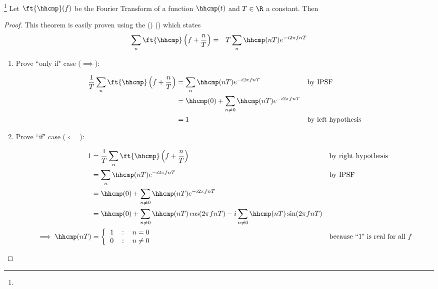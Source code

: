 \begin{theorem}
\footnote{
  }
\label{thm:unity}
Let $\ft{\hhcmp}(f)$ be the Fourier Transform of a function
$\hhcmp(t)$ and $T\in\R$ a constant.
Then
\thmbox{
  \left[
  \hhcmp(nT) =
  \left\{
     \begin{tabular}{lcl}
        1 & : & $n=0$ \\
        0 & : & $n\neq 0$
     \end{tabular}
  \right.
  \right]
  \qquad\iff\qquad
  \left[
    \frac{1}{T}\sum_n \ft{\hhcmp}\left(f+ \frac{n}{T} \right) = 1.
  \right]
  }
\end{theorem}
\begin{proof}
This theorem is easily proven using the
 ()
()
which states
\begin{eqnarray*}
   \sum_n \ft{\hhcmp}\left( f+ \frac{n}{T} \right)
       &=& T
           \sum_n \hhcmp(nT)
           e^{-i2\pi fnT}
\end{eqnarray*}

\begin{enumerate}
\item Prove ``only if" case ($\implies$):

\begin{align*}
  \frac{1}{T}\sum_n \ft{\hhcmp}\left( f + \frac{n}{T} \right)
     &= \sum_n \hhcmp(nT) e^{-i2\pi fnT}
     && \text{by IPSF}
   \\&= \hhcmp(0) + \sum_{n\ne0} \hhcmp(nT) e^{-i2\pi fnT}
   \\&= 1
     && \text{by left hypothesis}
\end{align*}


\item Prove ``if" case ($\impliedby$):

\begin{align*}
   1
     &= \frac{1}{T}\sum_n \ft{\hhcmp}\left( f+\frac{n}{T} \right)
     && \text{by right hypothesis}
   \\&= \sum_n \hhcmp(nT) e^{-i2\pi fnT}
     && \text{by IPSF}
   \\&= \hhcmp(0) + \sum_{n\ne 0} \hhcmp(nT) e^{-i2\pi fnT}
   \\&= \hhcmp(0) + \sum_{n\ne 0} \hhcmp(nT) \cos(2\pi fnT)
                     - i\sum_{n\ne 0} \hhcmp(nT) \sin(2\pi fnT)
   \\ \implies
   \hhcmp(nT)
       &= \left\{
        \begin{tabular}{lcl}
           1 & : & $n=0$    \\
           0 & : & $n\neq0$
        \end{tabular}
        \right.
       && \text{because ``1" is real for all $f$}
\end{align*}
\end{enumerate}
\end{proof}

